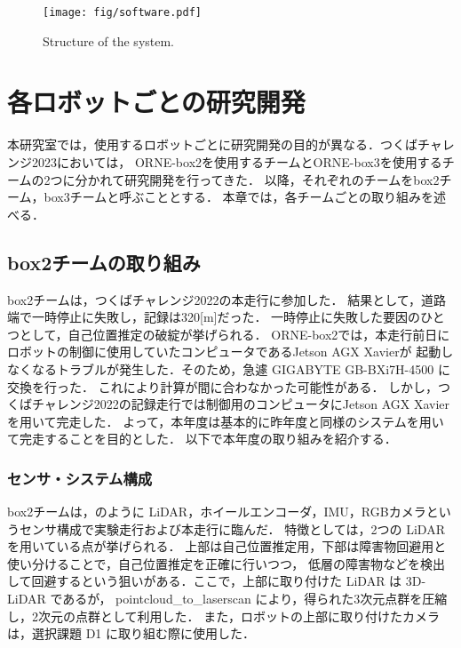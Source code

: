 \documentclass[twocolumn, 9pt]{jsproceedings}
\begin{document}
\begin{figure}[h!]
  \centering
  \texttt{[image: fig/software.pdf]}
  \caption{Structure of the system.}
  \label{fig:soft-fig}
\end{figure}

\vspace*{2mm}

\section{各ロボットごとの研究開発}
本研究室では，使用するロボットごとに研究開発の目的が異なる．つくばチャレンジ2023においては，
ORNE-box2を使用するチームとORNE-box3を使用するチームの2つに分かれて研究開発を行ってきた．
以降，それぞれのチームをbox2チーム，box3チームと呼ぶこととする．
本章では，各チームごとの取り組みを述べる．

\subsection{box2チームの取り組み}


box2チームは，つくばチャレンジ2022の本走行に参加した．
結果として，道路端で一時停止に失敗し，記録は320[m]だった．
一時停止に失敗した要因のひとつとして，自己位置推定の破綻が挙げられる．
ORNE-box2では，本走行前日にロボットの制御に使用していたコンピュータであるJetson AGX Xavierが
起動しなくなるトラブルが発生した．そのため，急遽 GIGABYTE GB-BXi7H-4500 に交換を行った．
これにより計算が間に合わなかった可能性がある．
しかし，つくばチャレンジ2022の記録走行では制御用のコンピュータにJetson AGX Xavierを用いて完走した．
よって，本年度は基本的に昨年度と同様のシステムを用いて完走することを目的とした．
以下で本年度の取り組みを紹介する．

\subsubsection{センサ・システム構成}
box2チームは，のように LiDAR，ホイールエンコーダ，IMU，RGBカメラというセンサ構成で実験走行および本走行に臨んだ．
特徴としては，2つの LiDAR を用いている点が挙げられる．
上部は自己位置推定用，下部は障害物回避用と使い分けることで，自己位置推定を正確に行いつつ，
低層の障害物などを検出して回避するという狙いがある．ここで，上部に取り付けた LiDAR は 3D-LiDAR であるが，
pointcloud\_to\_laserscan\cite{pointcloud} により，得られた3次元点群を圧縮し，2次元の点群として利用した．
また，ロボットの上部に取り付けたカメラは，選択課題 D1 に取り組む際に使用した．\\
\end{document}
